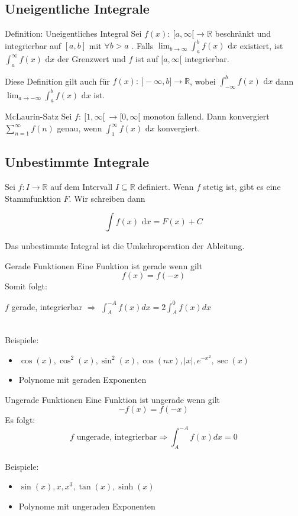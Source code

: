 \documentclass[a4paper,10pt]{article}
\def\R{\mathbb{R}}
\def\dx{\text{ d}x}
\begin{document}
\subsection{Uneigentliche Integrale}
\begin{subbox}{Definition: Uneigentliches Integral}
	Sei $f(x): \ [ a,\infty [ \to \R$ beschränkt und integrierbar auf $[a,b] $ mit $\forall b > a$ . Falls $\lim_{b\to\infty} \int_a^b f(x) \dx$ existiert, ist $\int_a^\infty f(x) \dx$ der Grenzwert und $f$ ist auf $[a, \infty[$ integrierbar.
		\end{subbox}
		Diese Definition gilt auch für $f(x) : \ ]-\infty,b] \to \R$, wobei $\int_{-\infty}^b f(x) \dx $ dann $ \lim_{a\to-\infty} \int_a^b f(x) \dx$ ist.
		\begin{subbox}{McLaurin-Satz}
			Sei $f: \ [1, \infty[ \ \to [0, \infty[$ monoton fallend. Dann konvergiert $\sum_{n=1}^\infty f(n)$ genau, wenn $\int_1^\infty f(x) \dx$ konvergiert.
				\end{subbox}
				
				\subsection{Unbestimmte Integrale}
				Sei $f: I \to \R$ auf dem Intervall $I \subseteq \R$ definiert. Wenn $f$ stetig ist, gibt es eine Stammfunktion $F$. Wir schreiben dann
				
				$$\int f(x) \dx = F(x) + C$$
				
				Das unbestimmte Integral ist die Umkehroperation der Ableitung.
				
				\begin{mainbox}{Gerade Funktionen}
					Eine Funktion ist gerade wenn gilt $$f(x) = f(-x)$$ Somit folgt: \\
					\centerline{$f$ gerade, integrierbar $\Rightarrow$ $\int_{A}^{-A}f(x)dx= 2 \int_{A}^{0}f(x)dx$}
					\\Beispiele:
					\begin{itemize}
						\item $\cos(x), \cos^2(x), \sin^2(x) , \cos(nx), |x|, e^{-x^2}, \sec(x)$
						\item Polynome mit geraden Exponenten
					\end{itemize}
				\end{mainbox}
				
				\begin{mainbox}{Ungerade Funktionen}
					Eine Funktion ist ungerade wenn gilt $$-f(x) = f(-x)$$ Es folgt: $$f \text{ ungerade, integrierbar}\Rightarrow \int_{A}^{-A}f(x)dx=0$$
					\\Beispiele:
					\begin{itemize}
						\item $\sin(x), x, x^3, \tan(x), \sinh(x)$
						\item Polynome mit ungeraden Exponenten
					\end{itemize}
					
				\end{mainbox}
				
\end{document}

